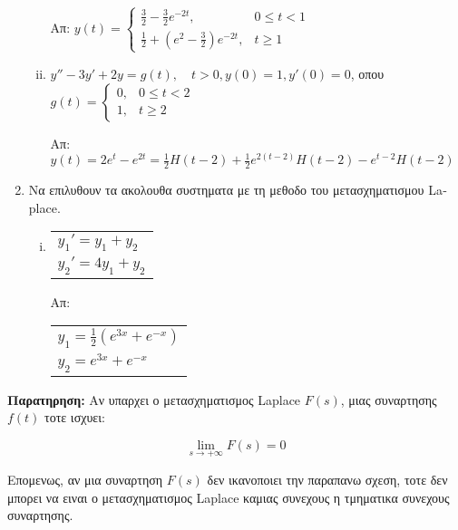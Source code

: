 \begin{enumerate}
\begin{enumerate}[i)]
\hfill Απ: $y(t)=\begin{cases} \frac{3}{2}-\frac{3}{2}e^{-2t},& 0\leq t<1 \\ \frac{1}{2}+(e^2-\frac{3}{2})e^{-2t}, & t\geq 1\end{cases}$

\item $y''-3y'+2y=g(t),\quad t>0, y(0)=1, y'(0)=0$, οπου $g(t)=\begin{cases} 0, & 0\leq t<2 \\ 1, & t\geq 2\end{cases}$

\hfill Απ: $y(t)=2e^t-e^{2t}=\frac{1}{2}H(t-2)+\frac{1}{2}e^{2(t-2)}H(t-2)-e^{t-2}H(t-2)$
\end{enumerate}






\item Να επιλυθουν τα ακολουθα συστηματα με τη μεθοδο του μετασχηματισμου \textlatin{Laplace}.

\begin{enumerate}[i)]

\item \begin{tabular}{l} $y_1'=y_1+y_2$ \\ $y_2'=4y_1+y_2$\end{tabular} \hfill Απ: \begin{tabular}{l} $y_1=\frac{1}{2}(e^{3x}+e^{-x})$ \\ $y_2=e^{3x}+e^{-x}$\end{tabular}


\end{enumerate}

\end{enumerate}

\vspace{\baselineskip}

\textbf{Παρατηρηση:} Αν υπαρχει ο μετασχηματισμος \textlatin{Laplace} $F(s)$, μιας συναρτησης $f(t)$ τοτε ισχυει:

\[
\lim\limits_{s\to+\infty}F(s)=0
\]

Επομενως, αν μια συναρτηση $F(s)$ δεν ικανοποιει την παραπανω σχεση, τοτε δεν μπορει να ειναι ο μετασχηματισμος \textlatin{Laplace} καμιας συνεχους η τμηματικα συνεχους συναρτησης.




